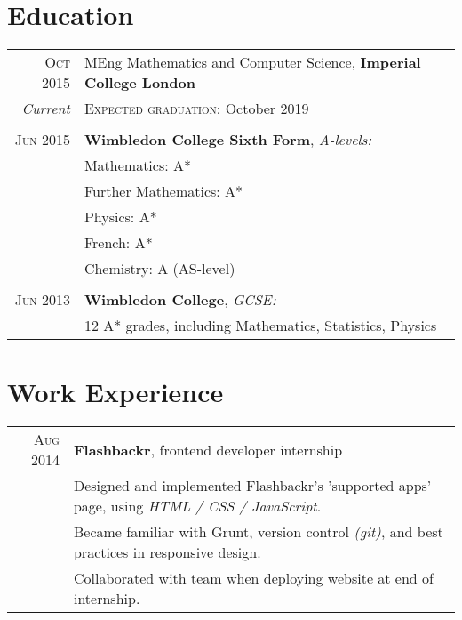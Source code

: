 \documentclass[a4paper,10pt]{article}
\begin{document}
\section{Education}
\begin{tabular}{rl}	
    \textsc{Oct} 2015 & MEng Mathematics and Computer Science, \textbf{Imperial College London}\\
    \emph{Current}    & \textsc{Expected graduation}: October 2019\\&\\
    \textsc{Jun} 2015 & \textbf{Wimbledon College Sixth Form}, \emph{A-levels:}\\
                      & Mathematics: A*\\
                      & Further Mathematics: A*\\
                      & Physics: A*\\
                      & French: A*\\
                      & Chemistry: A (AS-level)\\&\\
    \textsc{Jun} 2013 & \textbf{Wimbledon College}, \emph{GCSE:}\\
                      & 12 A* grades, including Mathematics, Statistics, Physics
\end{tabular}

\section{Work Experience}
\begin{tabular}{r|p{11cm}}
    \textsc{Aug} 2014 & \textbf{Flashbackr}, frontend developer internship\\
                      & \footnotesize{Designed and implemented Flashbackr's 'supported apps' page, using \emph{HTML / CSS / JavaScript}.}\\
                      & \footnotesize{Became familiar with Grunt, version control \emph{(git)}, and best practices in responsive design.}\\
                      & \footnotesize{Collaborated with team when deploying website at end of internship.}
\end{tabular}
\end{document}
